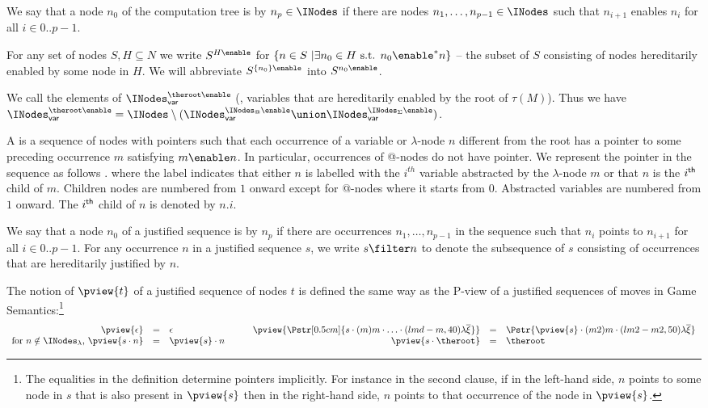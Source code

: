 We say that a node $n_0$ of the computation tree is
 by $n_p \in \INodes$ if there are nodes
$n_1,\ldots, n_{p-1} \in \INodes$ such that $n_{i+1}$ enables $n_{i}$ for
all $i\in 0..p-1$.

For any set of nodes $S, H \subseteq N$ we write $S^{H\enable}$ for
$\{ n \in S \ | \exists n_0 \in H \mbox{
s.t. }n_0  \enable^* n \}$ -- the subset of $S$ consisting of nodes
hereditarily enabled by some node in $H$. We will abbreviate
$S^{\{n_0\}\enable}$ into $S^{n_0\enable}$.

We call  the elements of $\INodes_{\sf var}^{\theroot\enable}$ (\ie, variables that are hereditarily enabled by the root of $\tau(M)$). Thus we have $\INodes_{\sf var}^{\theroot\enable} = \INodes \setminus ( \INodes_{\sf var}^{\INodes_@\enable} \union \INodes_{\sf var}^{\INodes_\Sigma\enable})$.

A  is a sequence of nodes with
pointers such that each occurrence of a variable or $\lambda$-node
$n$ different from the root has a pointer to some preceding
occurrence $m$ satisfying $m \enable n$. In particular, occurrences
of @-nodes do not have pointer. We represent the pointer in the
sequence as follows .
 where the label indicates that either $n$ is labelled with the $i^{th}$ variable
abstracted by the $\lambda$-node $m$ or that $n$ is the $i^{\sf th}$
child of $m$.  Children nodes are numbered from $1$ onward except for
@-nodes where it starts from $0$. Abstracted variables are numbered
from $1$ onward. The $i^{\sf th}$ child of $n$ is denoted by $n.i$.

We say that a node $n_0$ of a justified sequence is
 by $n_p$ if there are occurrences $n_1,
\ldots, n_{p-1}$ in the sequence such that $n_i$ points to $n_{i+1}$
for all $i\in 0..p-1$. For any occurrence $n$ in a justified
sequence $s$, we write $s \filter n$ to denote the subsequence of
$s$ consisting of occurrences that are hereditarily justified by
$n$.


The notion of  $\pview{t}$ of a justified sequence of
nodes $t$ is defined the same way as the P-view of a justified
sequences of moves in Game Semantics:\footnote{ The equalities in the
  definition determine pointers implicitly. For instance in the second
  clause, if in the left-hand side, $n$ points to some node in $s$
  that is also present in $\pview{s}$ then in the right-hand side, $n$
  points to that occurrence of the node in $\pview{s}$.}
$$\begin{array}{rclrcl}
\pview{\epsilon} &=&  \epsilon
& \pview{\Pstr[0.5cm]{ s \cdot (m) m \cdot \ldots \cdot (lmd-m,40){\lambda\overline{\xi}}
}}
 &=& \Pstr{
\pview{s} \cdot (m2) m \cdot (lm2-m2,50) {\lambda \overline{\xi}} } \\
\mbox{for $n \notin \INodes_\lambda$, } \pview{s \cdot n }  &=&  \pview{s} \cdot n \qquad
& \pview{s \cdot \theroot }  &=&  \theroot
\end{array}$$

